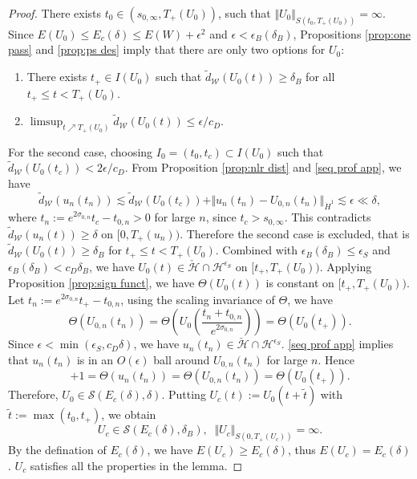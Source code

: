 \documentclass[reqno, 11pt]{amsart}
\numberwithin{equation}{section}
\theoremstyle{plain}
\theoremstyle{definition}
\numberwithin{equation}{section}
\numberwithin{theorem}{section}
\numberwithin{equation}{section}
\numberwithin{equation}{section}
\numberwithin{theorem}{section}
\begin{document}
\begin{proof}
		There exists $t_0\in (s_{0,\infty},T_+(U_0))$, such that $\Vert U_0 \Vert_{S(t_0,T_+(U_0))}=\infty$. Since $E(U_0)\leq E_c(\delta)\leq E(W)+\epsilon^2$ and $\epsilon<\epsilon_{B}(\delta_{B})$, Propositions \ref{prop:one pass} and \ref{prop:ps des} imply that there are only two options for $U_0$:
		\begin{enumerate}
			\item[$(1)$] There exists $t_+\in I(U_0)$ such that $\widetilde{d}_{\mathcal{W}}(U_0(t))\geq\delta_{B}$ for all $t_+\leq t<T_+(U_0)$.
			\item[$(2)$] $\limsup_{t\nearrow T_+(U_0)} \widetilde{d}_{\mathcal{W}}(U_0(t))\leq \epsilon/c_D$.
		\end{enumerate}
		For the second case, choosing $I_0=(t_0,t_c)\subset I(U_0)$ such that $\widetilde{d}_{\mathcal{W}}(U_0(t_c))<2\epsilon/c_D$. From Proposition \ref{prop:nlr dist} and \eqref{seq prof app}, we have
		\begin{equation*}
		\widetilde{d}_{\mathcal{W}}(u_n(t_n))\lesssim\widetilde{d}_{\mathcal{W}}(U_0(t_c))+\Vert u_n(t_n)-U_{0,n}(t_n)\Vert_{\dot H^1}\lesssim\epsilon\ll \delta,
		\end{equation*}
		where $t_n:=e^{2\sigma_{0,n}}t_c - t_{0,n}>0$ for large $n$, since $t_c
		>s_{0,\infty}$. This contradicts $\widetilde{d}_{\mathcal{W}}(u_n(t))\geq\delta$ on $[0,T_+(u_n))$. Therefore the second case is excluded, that is $\widetilde{d}_{\mathcal{W}}(U_0(t))\geq\delta_{B}$ for $t_+\leq t<T_+(U_0)$. Combined with $\epsilon_{B}(\delta_{B})\leq \epsilon_{S}$ and $\epsilon_{B}(\delta_{B})<c_D\delta_{B}$, we have $U_0(t)\in \check{\mathcal{H}}\cap\mathcal{H}^{\epsilon_S}$ on $[t_+,T_+(U_0))$. Applying Proposition \ref{prop:sign funct}, we have $\Theta(U_0(t))$ is constant on $[t_+,T_+(U_0))$. Let $t_n:=e^{2\sigma_{0,n}}t_+ - t_{0,n}$, using the scaling invariance of $\Theta$, we have 
		\begin{equation*}
		\Theta(U_{0,n}(t_n))=\Theta(U_0(\frac{t_n+t_{0,n}}{e^{2\sigma_{0,n}}}))=\Theta(U_0(t_+)).
		\end{equation*}
		Since $\epsilon< \min(\epsilon_{S},c_D\delta)$, we have $u_n(t_n)\in\check{\mathcal{H}}\cap\mathcal{H}^{\epsilon_S}$. \eqref{seq prof app} implies that $u_n(t_n)$ is in an $O(\epsilon)$ ball around $U_{0,n}(t_n)$ for large $n$. Hence
		\begin{equation*}
		+1=\Theta(u_n(t_n))=\Theta(U_{0,n}(t_n))=\Theta(U_0(t_+)).
		\end{equation*}
		Therefore, $U_0\in\mathscr{S}(E_c(\delta),\delta)$. Putting $U_c(t):=U_0\left(t+\widetilde{t}\right)$ with $\widetilde{t}:=\max(t_0,t_+)$, we obtain
		\begin{equation*}
		U_c\in\mathscr{S}(E_c(\delta),\delta_{B}),\;\;\Vert U_c \Vert_{S(0,T_{+}(U_c))}=\infty.
		\end{equation*}
		By the defination of $E_c(\delta)$, we have $E(U_c)\geq E_c(\delta)$, thus $E(U_c)=E_c(\delta)$. $U_c$ satisfies all the properties in the lemma.
		

\end{proof}
\end{document}

